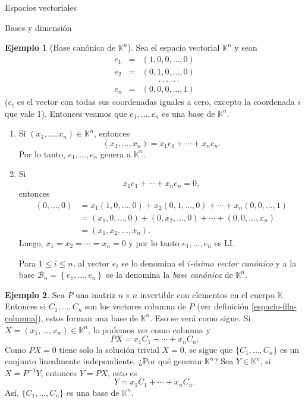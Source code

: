\documentclass[a4paper,12pt,twoside,spanish]{amsbook}
\theoremstyle{definition}
\newtheorem{ejemplo}{Ejemplo}[section]
\theoremstyle{remark}
\newcommand{\K}{\mathbb K}
\begin{document}
\begin{chapter}{Espacios vectoriales}
\begin{section}{Bases y dimensión}
\begin{ejemplo}[{\sc Base canónica de $\K^n$}] Sea el espacio vectorial $\K^n$ y sean
	\begin{equation*}
	\begin{array}{rcl}
	e_1 &=& (1,0,0,\ldots,0) \\
	e_2 &=& (0,1,0,\ldots,0) \\
	&&\qquad.\,.\,.\,.\,.\,.\,\\ 
	e_n&=& (0,0,0,\ldots,1)
	\end{array}
	\end{equation*}
	($e_i$ es el vector con todas sus coordenadas iguales a cero,  excepto  la coordenada $i$ que vale 1). Entonces veamos que  $e_1,\ldots,e_n$ es una base de $\K^n$.
	\begin{enumerate}
		\item Si $(x_1,\ldots,x_n) \in \K^n$,  entonces
		$$
		(x_1,\ldots,x_n) = x_1e_1+\cdots+x_ne_n.
		$$
		Por lo tanto, $e_1,\ldots,e_n$ genera a  $\K^n$.
		\item Si 
		$$
		x_1e_1+\cdots+x_ne_n =0,
		$$
		entonces
		\begin{align*}
			(0,\ldots,0) &= x_1(1,0,\ldots,0)+ x_2(0,1,\ldots,0)+\cdots+x_n(0,0,\ldots,1)\\ 
			&=  (x_1,0,\ldots,0)+(0,x_2,\ldots,0)+\cdots+(0,0,\ldots,x_n)\\ &= (x_1,x_2,\ldots,x_n).
		\end{align*}
		Luego, $x_1= x_2=\cdots=x_n =0$ y por lo tanto $e_1,\ldots,e_n$ es LI.
		
		Para $1 \le i \le n$, al vector $e_i$ se lo denomina el \textit{$i$-ésimo vector canónico}  y a la base $\mathcal B_n = \left\{e_1,\ldots,e_n \right\}$ se la denomina la \textit{base canónica} de $\K^n$. 
		
		
	\end{enumerate}
\end{ejemplo}
 
 
 \begin{ejemplo}
 	Sea $P$ una matriz $n \times n$ invertible con elementos en el cuerpo $\K$. Entonces si $C_1,\ldots,C_n$ son los vectores columna de $P$ (ver definición  \ref{espacio-fila-columna}), estos forman una base de $\K^n$. Eso se verá como sigue. Si $X = (x_1,\ldots,x_n) \in \K^n$, lo podemos ver como columna y 
 	$$
 	PX=x_1C_1+\cdots+x_nC_n.
 	$$
 	Como $PX=0$ tiene solo la solución trivial $X= 0$, se sigue que $\{C_1,\ldots,C_n\}$ es un conjunto linealmente independiente. ¿Por qué generan $\K^n$? Sea $Y \in \K^n$, si $X = P^{-1} Y$, entonces $Y = PX$, esto es
 	$$
 	Y=x_1C_1+\cdots+x_nC_n.
 	$$
 	Así, $\{C_1,\ldots,C_n\}$ es una base de $\K^n$.
 \end{ejemplo}



\end{section}
\end{chapter}
\end{document}
